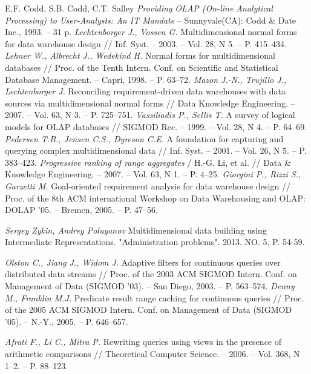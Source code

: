 \begin{thebibliography}{9}
  E.F. Codd, S.B. Codd, C.T. Salley
  \textit{Providing OLAP (On-line Analytical Processing) to User-Analysts: An IT
  Mandate} – Sunnyvale(CA): Codd \& Date Inc.,
  1993.
  – 31 p.
  \textit{Lechtenborger J.}, \textit{Vossen G.}
  Multidimensional normal forms for data warehouse design
  // Inf. Syst.
  – 2003.
  – Vol. 28, N 5. – P. 415–434. 
  \textit{Lehner W., Albrecht J., Wedekind H.}
  Normal forms for multidimensional databases
  // Proc. of the Tenth Intern. Conf. on Scientific and Statistical Database
  Management.
  – Capri, 1998.
  – P. 63–72.
  \textit{Mazon J.-N., Trujillo J., Lechtenborger J.}
  Reconciling requirement-driven data warehouses with data sources via
  multidimensional normal forms
  // Data Knowledge Engineering.
  – 2007.
  – Vol. 63, N 3. – P. 725–751.
  \textit{Vassiliadis P., Sellis T.}
  A survey of logical models for OLAP databases
  // SIGMOD Rec.
  – 1999.
  – Vol. 28, N 4. – P. 64–69.
  \textit{Pedersen T.B., Jensen C.S., Dyreson C.E.}
  A foundation for capturing and querying complex multidimensional data
  // Inf. Syst.
  – 2001.
  – Vol. 26, N 5. – P. 383–423.
  \textit{Progressive ranking of range aggregates}
  / H.-G. Li, et al.
  // Data \& Knowledge Engineering.
  – 2007.
  – Vol. 63, N 1. – P. 4–25. 
  \textit{Giorgini P., Rizzi S., Garzetti M.}
  Goal-oriented requirement analysis for data warehouse design
  // Proc. of the 8th ACM international Workshop on Data Warehousing and OLAP: DOLAP '05.
  – Bremen, 2005.
  – P. 47–56.

  \textit{Sergey Zykin, Andrey Poluyanov}
  Multidimensional data building using Intermediate Representations.
  "Administration problems".
  2013.
  NO. 5, P. 54-59.

  \textit{Olston C., Jiang J., Widom J.}
  Adaptive filters for continuous queries over distributed data streams
  // Proc. of the 2003 ACM SIGMOD Intern. Conf. on Management of Data (SIGMOD '03).
  – San Diego, 2003.
  – P. 563–574.
  \textit{Denny M., Franklin M.J.}
  Predicate result range caching for continuous queries
  // Proc. of the 2005 ACM SIGMOD Intern. Conf. on Management of Data (SIGMOD '05).
  – N.-Y., 2005.
  – P. 646–657.

  \textit{Afrati F., Li C., Mitra P.}
  Rewriting queries using views in the presence of arithmetic comparisons
  // Theoretical Computer Science.
  – 2006.
 – Vol. 368, N 1–2. – P. 88–123.


\end{thebibliography}
